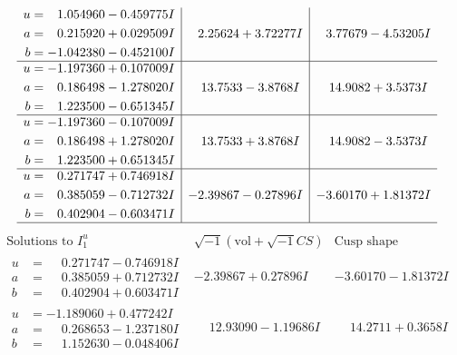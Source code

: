 \documentclass[1p]{elsarticle_modified}
\theoremstyle{definition}
\newcommand{\I}{\sqrt{-1}}
\begin{document}
$$\begin{array}{c|c|c}
\begin{aligned}
u &= \phantom{-}1.054960 - 0.459775 I \\
a &= \phantom{-}0.215920 + 0.029509 I \\
b &= -1.042380 - 0.452100 I\end{aligned}
 & \phantom{-}2.25624 + 3.72277 I & \phantom{-}3.77679 - 4.53205 I \\ \hline\begin{aligned}
u &= -1.197360 + 0.107009 I \\
a &= \phantom{-}0.186498 - 1.278020 I \\
b &= \phantom{-}1.223500 - 0.651345 I\end{aligned}
 & \phantom{-}13.7533 - 3.8768 I & \phantom{-}14.9082 + 3.5373 I \\ \hline\begin{aligned}
u &= -1.197360 - 0.107009 I \\
a &= \phantom{-}0.186498 + 1.278020 I \\
b &= \phantom{-}1.223500 + 0.651345 I\end{aligned}
 & \phantom{-}13.7533 + 3.8768 I & \phantom{-}14.9082 - 3.5373 I \\ \hline\begin{aligned}
u &= \phantom{-}0.271747 + 0.746918 I \\
a &= \phantom{-}0.385059 - 0.712732 I \\
b &= \phantom{-}0.402904 - 0.603471 I\end{aligned}
 & -2.39867 - 0.27896 I & -3.60170 + 1.81372 I\\
 \hline 
 \end{array}$$\newpage$$\begin{array}{c|c|c}  
\text{Solutions to }I^u_{1}& \I (\text{vol} + \sqrt{-1}CS) & \text{Cusp shape}\\
 \hline 
\begin{aligned}
u &= \phantom{-}0.271747 - 0.746918 I \\
a &= \phantom{-}0.385059 + 0.712732 I \\
b &= \phantom{-}0.402904 + 0.603471 I\end{aligned}
 & -2.39867 + 0.27896 I & -3.60170 - 1.81372 I \\ \hline\begin{aligned}
u &= -1.189060 + 0.477242 I \\
a &= \phantom{-}0.268653 - 1.237180 I \\
b &= \phantom{-}1.152630 - 0.048406 I\end{aligned}
 & \phantom{-}12.93090 - 1.19686 I & \phantom{-}14.2711 + 0.3658 I \\ \hline\begin{aligned}

\end{aligned}
\end{array}$$
\end{document}
